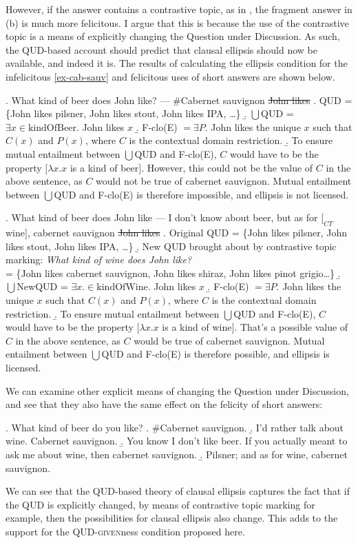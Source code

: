 \documentclass[11pt,letterpaper]{article}
\newcommand{\pred}[1]{\ensuremath{\mathrm{{#1}}}}
\begin{document}
However, if the answer contains a contrastive topic, as in \Last, the fragment answer in (b) is much more felicitous.
I argue that this is because the use of the contrastive topic is a means of explicitly changing the Question under Discussion.
As such, the QUD-based account should predict that clausal ellipsis should now be available, and indeed it is.
The results of calculating the ellipsis condition for the infelicitous \ref{ex-cab-sauv} and felicitous \Last[b] uses of short answers are shown below. 

\ex. 	What kind of beer does John like? --- \#Cabernet sauvignon \sout{John likes}
	\a. QUD = \{John likes pilsner, John likes stout, John likes IPA, \ldots\}
	\b. $\bigcup$QUD = $\exists x \in \pred{kindOfBeer}$. John likes $x$
	\b. F-clo(E) $= \exists P. $ John likes the unique $x$ such that $C(x)$ and $P(x)$, where $C$ is the contextual domain restriction.
	\b. To ensure mutual entailment between $\bigcup$QUD and F-clo(E), $C$ would have to be the property $[\lambda x. x$ is a kind of beer$]$. However, this could not be the value of $C$ in the above sentence, as $C$ would not be true of cabernet sauvignon. Mutual entailment between $\bigcup$QUD and F-clo(E) is therefore impossible, and ellipsis is not licensed.
	
\ex. 	What kind of beer does John like --- I don't know about beer, but as for $[_{CT}$ wine$]$, cabernet sauvignon \sout{John likes}
	\a. Original QUD = \{John likes pilsner, John likes stout, John likes IPA, \ldots\}
	\b. New QUD brought about by contrastive topic marking: {\it What kind of wine does John like?}\\
	= \{John likes cabernet sauvignon, John likes shiraz, John likes pinot grigio\ldots\}
	\b. $\bigcup$NewQUD = $\exists x. \in \pred{kindOfWine}. $ John likes $x$
	\b. F-clo(E) $= \exists P. $ John likes the unique $x$ such that $C(x)$ and $P(x)$, where $C$ is the contextual domain restriction.
	\b. To ensure mutual entailment between $\bigcup$QUD and F-clo(E), $C$ would have to be the property $[\lambda x. x$ is a kind of wine$]$. That's a possible value of $C$ in the above sentence, as $C$ would be true of cabernet sauvignon. Mutual entailment between $\bigcup$QUD and F-clo(E) is therefore possible, and ellipsis is licensed.
	
We can examine other explicit means of changing the Question under Discussion, and see that they also have the same effect on the felicity of short answers:

\ex. 	What kind of beer do you like?
	\a. \#Cabernet sauvignon.
	\b. I'd rather talk about wine. Cabernet sauvignon.
	\b. You know I don't like beer. If you actually meant to ask me about wine, then cabernet sauvignon.
	\b. Pilsner; and as for wine, cabernet sauvignon.

We can see that the QUD-based theory of clausal ellipsis captures the fact that if the QUD is explicitly changed, by means of contrastive topic marking for example, then the possibilities for clausal ellipsis also change.
This adds to the support for the \textsc{QUD-given}ness condition proposed here.
\end{document}
